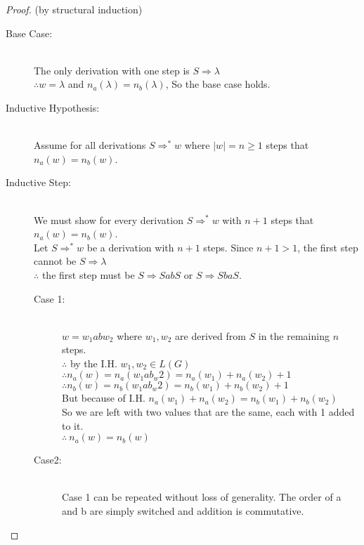 \documentclass{article}
\begin{document}
\begin{description}
\begin{description}
    \begin{proof}
      (by structural induction)
      \begin{description}
      \item[Base Case:]\hfill \\
        The only derivation with one step is $S \Rightarrow \lambda$\\
        $\therefore w = \lambda$ and $n_a(\lambda) = n_b(\lambda)$, So the base case holds.
      \item[Inductive Hypothesis:]\hfill \\
        Assume for all derivations $S \Rightarrow^* w$ where $|w| = n \ge 1$ steps that $n_a(w) = n_b(w)$.
      \item[Inductive Step:]\hfill \\
        We must show for every derivation $S \Rightarrow^* w$ with $n+1$ steps that $n_a(w) =n_b(w)$.\\
        Let $S\Rightarrow^* w$ be a derivation with $n+1$ steps. Since $n+1 > 1$, the first step cannot be $S \Rightarrow \lambda$\\
        $\therefore$ the first step must be $S\Rightarrow SabS$ or  $S\Rightarrow SbaS$.
        \begin{description}
        \item[Case 1:]\hfill \\
          $w=w_1 ab w_2$ where $w_1,w_2$ are derived from $S$ in the remaining $n$ steps.\\
          $\therefore$ by the I.H. $w_1,w_2 \in L(G)$\\
          $\therefore n_a(w) = n_a(w_1ab_w2) = n_a(w_1) + n_a(w_2) + 1$\\
          $\therefore n_b(w) = n_b(w_1ab_w2) = n_b(w_1) + n_b(w_2) + 1$\\
          But because of I.H. $n_a(w_1) + n_a(w_2) =  n_b(w_1) + n_b(w_2) $\\
          So we are left with two values that are the same, each with 1 added to it.\\
          $\therefore~ n_a(w) = n_b(w)$ 
        \item[Case2:]\hfill \\
          Case 1 can be repeated without loss of generality. The order of a and b are simply switched and addition is commutative.
        \end{description}
        
      \end{description}
    \end{proof}


\end{description}
\end{description}
\end{document}
